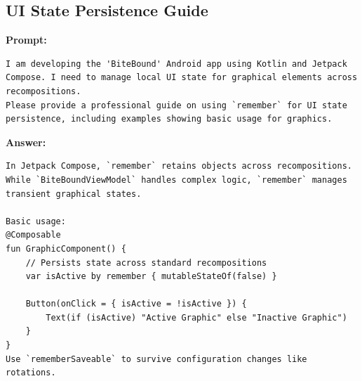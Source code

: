 \subsection*{UI State Persistence Guide}
\textbf{Prompt:}
\begin{lstlisting}[language={}, breaklines=true]
I am developing the 'BiteBound' Android app using Kotlin and Jetpack Compose. I need to manage local UI state for graphical elements across recompositions. 
Please provide a professional guide on using `remember` for UI state persistence, including examples showing basic usage for graphics.
\end{lstlisting}
\textbf{Answer:}
\begin{lstlisting}[language={}, breaklines=true]
In Jetpack Compose, `remember` retains objects across recompositions. While `BiteBoundViewModel` handles complex logic, `remember` manages transient graphical states.

Basic usage:
@Composable
fun GraphicComponent() {
    // Persists state across standard recompositions
    var isActive by remember { mutableStateOf(false) }

    Button(onClick = { isActive = !isActive }) {
        Text(if (isActive) "Active Graphic" else "Inactive Graphic")
    }
}
Use `rememberSaveable` to survive configuration changes like rotations.
\end{lstlisting}